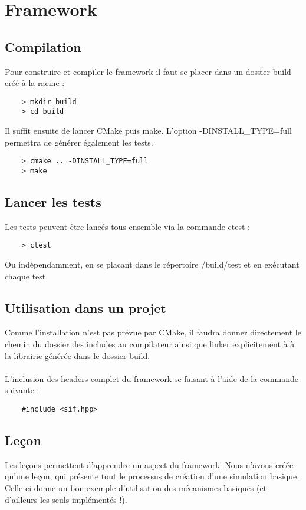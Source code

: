 \section{Framework}
\subsection{Compilation}
Pour construire et compiler le framework il faut se placer dans un dossier build créé à la racine :

\begin{verbatim}
    > mkdir build
    > cd build
\end{verbatim}

Il suffit ensuite de lancer CMake puis make. L'option -DINSTALL\_TYPE=full permettra de générer également les tests.

\begin{verbatim}
    > cmake .. -DINSTALL_TYPE=full
    > make
\end{verbatim}

\subsection{Lancer les tests}

Les tests peuvent être lancés tous ensemble via la commande ctest :
\begin{verbatim}
    > ctest
\end{verbatim}

Ou indépendamment, en se placant dans le répertoire /build/test et en exécutant chaque test.

\subsection{Utilisation dans un projet}

Comme l'installation n'est pas prévue par CMake, il faudra donner directement le chemin du dossier des includes au compilateur ainsi que linker explicitement à à la librairie générée dans le dossier build.\\\\

L'inclusion des headers complet du framework se faisant à l'aide de la commande suivante :
\begin{verbatim}
    #include <sif.hpp>
\end{verbatim}

\subsection{Leçon}
Les leçons permettent d'apprendre un aspect du framework. Nous n'avons créée qu'une leçon, qui présente tout le processus de création d'une simulation basique. Celle-ci donne un bon exemple d'utilisation des mécanismes basiques (et d'ailleurs les seuls implémentés !).

